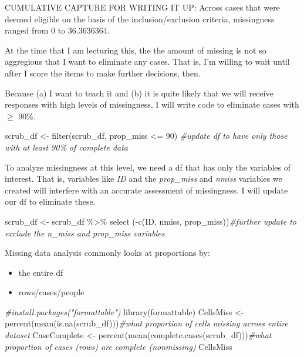 \documentclass[
  english,
]{book}
\newenvironment{Shaded}{\begin{snugshade}}{\end{snugshade}}
\newcommand{\CommentTok}[1]{\textcolor[rgb]{0.56,0.35,0.01}{\textit{#1}}}
\newcommand{\DecValTok}[1]{\textcolor[rgb]{0.00,0.00,0.81}{#1}}
\newcommand{\FunctionTok}[1]{\textcolor[rgb]{0.00,0.00,0.00}{#1}}
\newcommand{\NormalTok}[1]{#1}
\newcommand{\OtherTok}[1]{\textcolor[rgb]{0.56,0.35,0.01}{#1}}
\newcommand{\SpecialCharTok}[1]{\textcolor[rgb]{0.00,0.00,0.00}{#1}}
\providecommand{\tightlist}{%
  \setlength{\itemsep}{0pt}\setlength{\parskip}{0pt}}
\begin{document}
CUMULATIVE CAPTURE FOR WRITING IT UP: Across cases that were deemed eligible on the basis of the inclusion/exclusion criteria, missingness ranged from 0 to 36.3636364.

At the time that I am lecturing this, the the amount of missing is not so aggregious that I want to eliminate any cases. That is, I'm willing to wait until after I score the items to make further decisions, then.

Because (a) I want to teach it and (b) it is quite likely that we will receive responses with high levels of missingness, I will write code to eliminate cases with \(\geq\) 90\%.

\begin{Shaded}
\begin{Highlighting}[]
\NormalTok{scrub\_df }\OtherTok{\textless{}{-}} \FunctionTok{filter}\NormalTok{(scrub\_df, prop\_miss }\SpecialCharTok{\textless{}=} \DecValTok{90}\NormalTok{)  }\CommentTok{\#update df to have only those with at least 90\% of complete data}
\end{Highlighting}
\end{Shaded}

To analyze missingness at this level, we need a df that has only the variables of interest. That is, variables like \emph{ID} and the \emph{prop\_miss} and \emph{nmiss} variables we created will interfere with an accurate assessment of missingness. I will update our df to eliminate these.

\begin{Shaded}
\begin{Highlighting}[]
\NormalTok{scrub\_df }\OtherTok{\textless{}{-}}\NormalTok{ scrub\_df }\SpecialCharTok{\%\textgreater{}\%}
  \FunctionTok{select}\NormalTok{ (}\SpecialCharTok{{-}}\FunctionTok{c}\NormalTok{(ID, nmiss, prop\_miss))}\CommentTok{\#further update to exclude the n\_miss and prop\_miss variables}
\end{Highlighting}
\end{Shaded}

Missing data analysis commonly looks at proportions by:

\begin{itemize}
\tightlist
\item
  the entire df
\item
  rows/cases/people
\end{itemize}

\begin{Shaded}
\begin{Highlighting}[]
\CommentTok{\#install.packages("formattable")}
\FunctionTok{library}\NormalTok{(formattable)}
\NormalTok{CellsMiss }\OtherTok{\textless{}{-}} \FunctionTok{percent}\NormalTok{(}\FunctionTok{mean}\NormalTok{(}\FunctionTok{is.na}\NormalTok{(scrub\_df)))}\CommentTok{\#what proportion of cells missing across entire dataset}
\NormalTok{CaseComplete }\OtherTok{\textless{}{-}} \FunctionTok{percent}\NormalTok{(}\FunctionTok{mean}\NormalTok{(}\FunctionTok{complete.cases}\NormalTok{(scrub\_df)))}\CommentTok{\#what proportion of cases (rows) are complete (nonmissing)}
\NormalTok{CellsMiss}
\end{Highlighting}
\end{Shaded}
\end{document}
